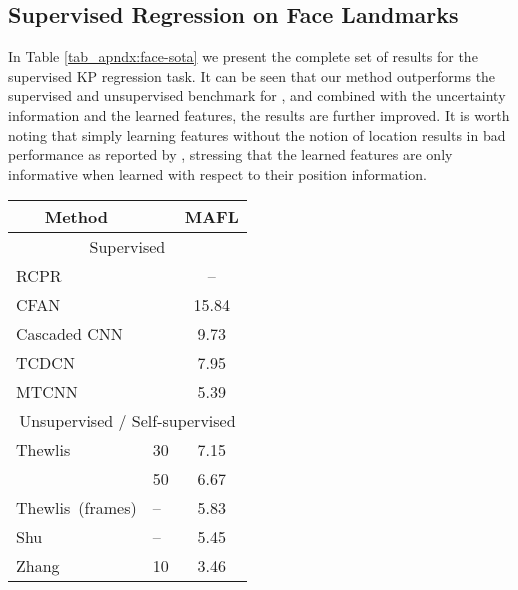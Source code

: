 \documentclass[nohyperref]{article}
\theoremstyle{plain}
\theoremstyle{definition}
\theoremstyle{remark}
\begin{document}
\subsection{Supervised Regression on Face Landmarks}
\label{apndx:supervised_kp}
In Table \ref{tab_apndx:face-sota} we present the complete set of results for the supervised KP regression task. It can be seen that our method outperforms the supervised and unsupervised benchmark for , and combined with the uncertainty information and the learned features, the results are further improved. It is worth noting that simply learning features without the notion of location results in bad performance as reported by \citet{jakab2018unsupervised}, stressing that the learned features are only informative when learned with respect to their position information.
\begin{table}
\setlength{\tabcolsep}{4pt}
    \centering
    \begin{tabular}{@{}llc@{}}
    \toprule
    \multicolumn{1}{c}{Method}                    &   & MAFL        \\ \midrule
    \multicolumn{3}{c}{Supervised}                                           \\
    RCPR~\citep{burgos2013robust}                 &      & {--}                         \\
    CFAN~\citep{zhang2014coarse}                  &      & 15.84                         \\
    Cascaded CNN~\citep{sun2013deep}              &      & 9.73                          \\
    TCDCN~\citep{zhang2015learning}                       &      & 7.95                           \\
    MTCNN~\citep{zhang2014facial}                 &      & 5.39                         \\ \midrule
    \multicolumn{3}{c}{Unsupervised / Self-supervised}                                           \\
    Thewlis~\citep{thewlis2017unsupervised1}          & 30   & 7.15                         \\
                                                  & 50   & 6.67                         \\
    Thewlis~\citep{thewlis2017unsupervised2}(frames) & {--} & 5.83                          \\
    Shu~\citep{shu2018deforming}         & {--} & 5.45                            \\
    Zhang~\citep{zhang2018kp}            & 10   & 3.46                           \\

\end{tabular}
\end{table}
\end{document}
